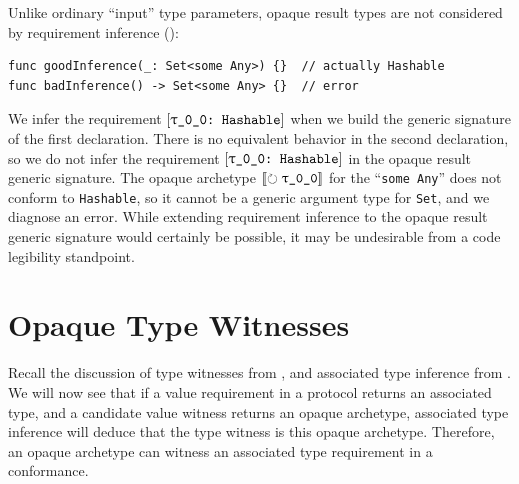 \documentclass[../generics]{subfiles}
\begin{document}
\begin{example}
Unlike ordinary ``input'' type parameters, opaque result types are not considered by requirement inference ():
\begin{Verbatim}
func goodInference(_: Set<some Any>) {}  // actually Hashable
func badInference() -> Set<some Any> {}  // error
\end{Verbatim}

We infer the requirement $\ConfReq{\rT}{Hashable}$ when we build the generic signature of the first declaration. There is no equivalent behavior in the second declaration, so we do not infer the requirement $\ConfReq{\rT}{Hashable}$ in the opaque result generic signature. The opaque archetype $\Ox$ for the ``\texttt{some Any}'' does not conform to \texttt{Hashable}, so it cannot be a generic argument type for \texttt{Set}, and we diagnose an error. While extending requirement inference to the opaque result generic signature would certainly be possible, it may be undesirable from a code legibility standpoint.
\end{example}

\section{Opaque Type Witnesses}\label{reference opaque archetype}

Recall the discussion of type witnesses from , and associated type inference from . We will now see that if a value requirement in a protocol returns an associated type, and a candidate value witness returns an opaque archetype, associated type inference will deduce that the type witness is this opaque archetype. Therefore, an opaque archetype can witness an associated type requirement in a conformance.
\end{document}
